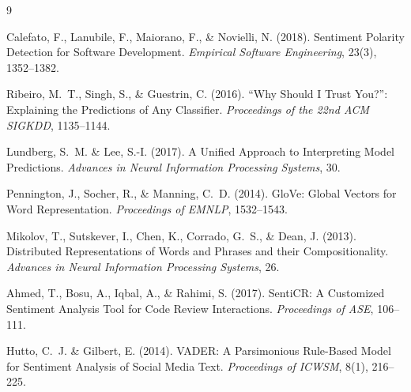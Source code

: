 \documentclass[11pt,a4paper]{article}
\begin{document}
\begin{thebibliography}{9}

Calefato, F., Lanubile, F., Maiorano, F., \& Novielli, N. (2018).
Sentiment Polarity Detection for Software Development.
\textit{Empirical Software Engineering}, 23(3), 1352--1382.

Ribeiro, M.~T., Singh, S., \& Guestrin, C. (2016).
``Why Should I Trust You?'': Explaining the Predictions of Any Classifier.
\textit{Proceedings of the 22nd ACM SIGKDD}, 1135--1144.

Lundberg, S.~M. \& Lee, S.-I. (2017).
A Unified Approach to Interpreting Model Predictions.
\textit{Advances in Neural Information Processing Systems}, 30.

Pennington, J., Socher, R., \& Manning, C.~D. (2014).
GloVe: Global Vectors for Word Representation.
\textit{Proceedings of EMNLP}, 1532--1543.

Mikolov, T., Sutskever, I., Chen, K., Corrado, G.~S., \& Dean, J. (2013).
Distributed Representations of Words and Phrases and their Compositionality.
\textit{Advances in Neural Information Processing Systems}, 26.

Ahmed, T., Bosu, A., Iqbal, A., \& Rahimi, S. (2017).
SentiCR: A Customized Sentiment Analysis Tool for Code Review Interactions.
\textit{Proceedings of ASE}, 106--111.

Hutto, C.~J. \& Gilbert, E. (2014).
VADER: A Parsimonious Rule-Based Model for Sentiment Analysis of Social Media Text.
\textit{Proceedings of ICWSM}, 8(1), 216--225.

\end{thebibliography}
\end{document}
